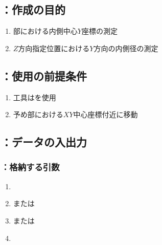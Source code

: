 \clearpage


\subsection{\MYIWidth：作成の目的}
\begin{enumerate}[label*=\sarrow]
\item \EndFace 部における内側中心$Y$座標の測定
\item $Z$方向指定位置における$Y$方向の内側径の測定
\end{enumerate}


\subsection{\MYIWidth：使用の前提条件}
\begin{enumerate}[label*=\sarrow]
\item 工具は\TouchSensorProbe を使用
\item 予め\EndFace 部における$XY$中心座標付近に移動
\end{enumerate}


\subsection{\MYIWidth：データの入出力}

\subsubsection{\MYIWidth：格納する引数}
\begin{enumerate}[label*=\sarrow]
\item \PMBDOD
\item \PMTopEndBDID または\PMBottomEndBDID
\item \PMTopReAlocationLength または\PMBottomReAlocationLength
\item \PMPlatingThk
\end{enumerate}


